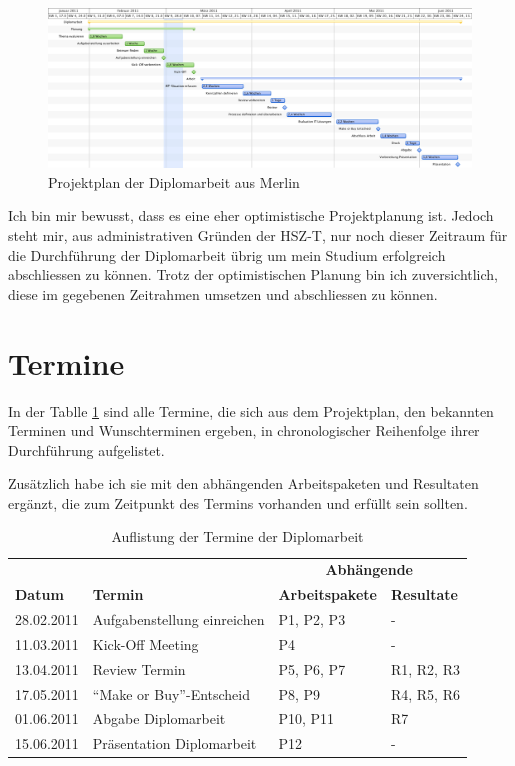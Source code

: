 \begin{figure}[htbp]
\begin{center}
\includegraphics[width=1\textwidth,angle=0]{./bilder/anhang/projektplanung.pdf}
\caption{Projektplan der Diplomarbeit aus Merlin}
\label{pic:projektplan}
\end{center}
\end{figure}

Ich bin mir bewusst, dass es eine eher optimistische Projektplanung ist. Jedoch
steht mir, aus administrativen Gründen der HSZ-T, nur noch dieser Zeitraum für
die Durchführung der Diplomarbeit übrig um mein Studium erfolgreich abschliessen
zu können. Trotz der optimistischen Planung bin ich zuversichtlich, diese
im gegebenen Zeitrahmen umsetzen und abschliessen zu können.

\section{Termine}
In der Tablle \ref{tab:termine_diplomarbeit} sind alle Termine, die sich aus 
dem Projektplan, den bekannten Terminen und Wunschterminen ergeben, in chronologischer
Reihenfolge ihrer Durchführung aufgelistet.

Zusätzlich habe ich sie mit den abhängenden Arbeitspaketen
und Resultaten ergänzt, die zum Zeitpunkt des Termins vorhanden und erfüllt
sein sollten.

\begin{table}[htbp]
\begin{center}
    \begin{tabular}{llll}
        \toprule & & \multicolumn{2}{c}{\textbf{Abhängende}} \\
        \textbf{Datum} & \textbf{Termin} & \textbf{Arbeitspakete} & \textbf{Resultate} \\
        \midrule 28.02.2011 & Aufgabenstellung einreichen & P1, P2, P3 & - \\
        \midrule 11.03.2011 & Kick-Off Meeting & P4 & -\\
        \midrule 13.04.2011 & Review Termin & P5, P6, P7 & R1, R2, R3 \\
        \midrule 17.05.2011 & ``Make or Buy''-Entscheid & P8, P9 & R4, R5, R6 \\
        \midrule 01.06.2011 & Abgabe Diplomarbeit & P10, P11 & R7 \\
        \midrule 15.06.2011 & Präsentation Diplomarbeit & P12 & - \\
        \bottomrule
    \end{tabular}
    \caption{Auflistung der Termine der Diplomarbeit}
    \label{tab:termine_diplomarbeit}
\end{center}
\end{table}

